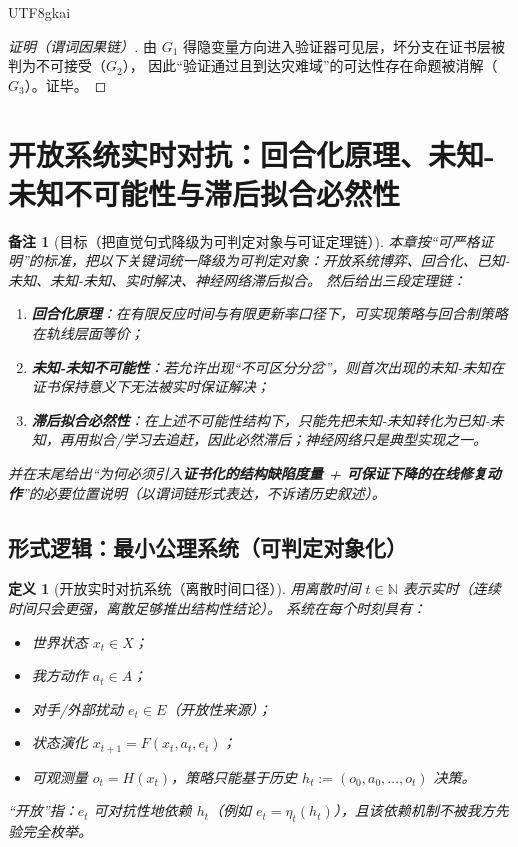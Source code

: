 \documentclass[12pt]{article}
\newtheorem{definition}{定义}[section]
\newtheorem{remark}{备注}[section]
\newcommand{\NN}{\mathbb{N}}
\begin{document}
\begin{CJK*}{UTF8}{gkai}
\begin{proof}[证明（谓词因果链）]
由 $G_1$ 得隐变量方向进入验证器可见层，坏分支在证书层被判为不可接受（$G_2$），
因此“验证通过且到达灾难域”的可达性存在命题被消解（$G_3$）。证毕。
\end{proof}

\clearpage

\section{开放系统实时对抗：回合化原理、未知-未知不可能性与滞后拟合必然性}
\label{sec:rt-open-adversarial-turn-uu-lag}

\begin{remark}[目标（把直觉句式降级为可判定对象与可证定理链）]
本章按“可严格证明”的标准，把以下关键词统一降级为可判定对象：开放系统博弈、回合化、已知-未知、未知-未知、实时解决、神经网络滞后拟合。
然后给出三段定理链：
\begin{enumerate}
  \item \textbf{回合化原理}：在有限反应时间与有限更新率口径下，可实现策略与回合制策略在轨线层面等价；
  \item \textbf{未知-未知不可能性}：若允许出现“不可区分分岔”，则首次出现的未知-未知在证书保持意义下无法被实时保证解决；
  \item \textbf{滞后拟合必然性}：在上述不可能性结构下，只能先把未知-未知转化为已知-未知，再用拟合/学习去追赶，因此必然滞后；神经网络只是典型实现之一。
\end{enumerate}
并在末尾给出“为何必须引入\textbf{证书化的结构缺陷度量 + 可保证下降的在线修复动作}”的必要位置说明（以谓词链形式表达，不诉诸历史叙述）。
\end{remark}

\subsection{形式逻辑：最小公理系统（可判定对象化）}
\label{sec:rt-open-adversarial-min-axioms}

\begin{definition}[开放实时对抗系统（离散时间口径）]
\label{def:rt-open-adversarial-system}
用离散时间 $t\in\NN$ 表示实时（连续时间只会更强，离散足够推出结构性结论）。
系统在每个时刻具有：
\begin{itemize}
  \item 世界状态 $x_t\in X$；
  \item 我方动作 $a_t\in A$；
  \item 对手/外部扰动 $e_t\in E$（开放性来源）；
  \item 状态演化 $x_{t+1}=F(x_t,a_t,e_t)$；
  \item 可观测量 $o_t=H(x_t)$，策略只能基于历史 $h_t:=(o_0,a_0,\dots,o_t)$ 决策。
\end{itemize}
“开放”指：$e_t$ 可对抗性地依赖 $h_t$（例如 $e_t=\eta_t(h_t)$），且该依赖机制不被我方先验完全枚举。
\end{definition}


\end{CJK*}
\end{document}

